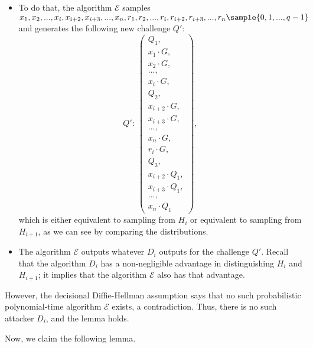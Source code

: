 \documentclass{article}
\begin{document}
\begin{itemize}
    \item To do that, the algorithm $\mathcal{E}$ samples $x_1, x_2, ..., x_i, x_{i+2}, x_{i+3}, ..., x_{n},r_1,r_2,...,\allowbreak r_i,\allowbreak r_{i+2},\allowbreak r_{i+3}, ..., r_{n}\sample\{0,1,...,q-1\}$ and generates the following new challenge $Q'$: 
    \[
    Q':~\left(\begin{array}{l}
    Q_1,\\
    x_1\cdot G,\\
    x_2\cdot G,\\
    ...,\\
    x_i\cdot G,\\
    Q_2,\\
    x_{i+2}\cdot G,\\
    x_{i+3}\cdot G,\\
    ...,\\
    x_n\cdot G,\\
    r_i\cdot G,\\
    Q_3,\\
    x_{i+2}\cdot Q_1,\\
    x_{i+3}\cdot Q_1,\\
    ...,\\
    x_{n}\cdot Q_1
    \end{array}\right),
    \]
    which is either equivalent to sampling from $H_i$ or equivalent to sampling from $H_{i+1}$, as we can see by comparing the distributions. 
    
    \item The algorithm $\mathcal{E}$ outputs whatever $D_i$ outputs for the challenge $Q'$. Recall that the algorithm $D_i$ has a non-negligible advantage in distinguishing $H_i$ and $H_{i+1}$; it implies that the algorithm $\mathcal{E}$ also has that advantage. 
\end{itemize}
However, the decisional Diffie-Hellman assumption says that no such probabilistic polynomial-time algorithm $\mathcal{E}$ exists, a contradiction. Thus, there is no such attacker $D_i$, and the lemma holds. 

Now, we claim the following lemma.
\end{document}
